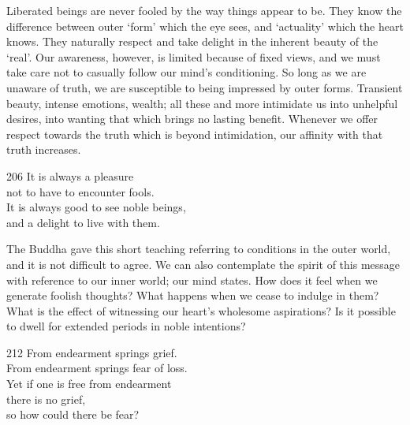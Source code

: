 \begin{dhpRefl}
  Liberated beings are never fooled by the way things appear to be. They know
  the difference between outer ‘form’ which the eye sees, and ‘actuality’ which
  the heart knows. They naturally respect and take delight in the inherent
  beauty of the ‘real’. Our awareness, however, is limited because of fixed
  views, and we must take care not to casually follow our mind’s conditioning.
  So long as we are unaware of truth, we are susceptible to being impressed by
  outer forms. Transient beauty, intense emotions, wealth; all these and more
  intimidate us into unhelpful desires, into wanting that which brings no
  lasting benefit. Whenever we offer respect towards the truth which is beyond
  intimidation, our affinity with that truth increases.
\end{dhpRefl}


\begin{dhpVerse}{206}
\label{dhp-206}
It is always a pleasure\\
not to have to encounter fools.\\
It is always good to see noble beings,\\
and a delight to live with them.
\end{dhpVerse}

\begin{dhpRefl}
  The Buddha gave this short teaching referring to conditions in the outer
  world, and it is not difficult to agree. We can also contemplate the spirit of
  this message with reference to our inner world; our mind states. How does it
  feel when we generate foolish thoughts? What happens when we cease to indulge
  in them? What is the effect of witnessing our heart’s wholesome aspirations?
  Is it possible to dwell for extended periods in noble intentions?
\end{dhpRefl}


\begin{dhpVerse}{212}
\label{dhp-212}
From endearment springs grief.\\
From endearment springs fear of loss.\\
Yet if one is free from endearment\\
there is no grief,\\
so how could there be fear?
\end{dhpVerse}

